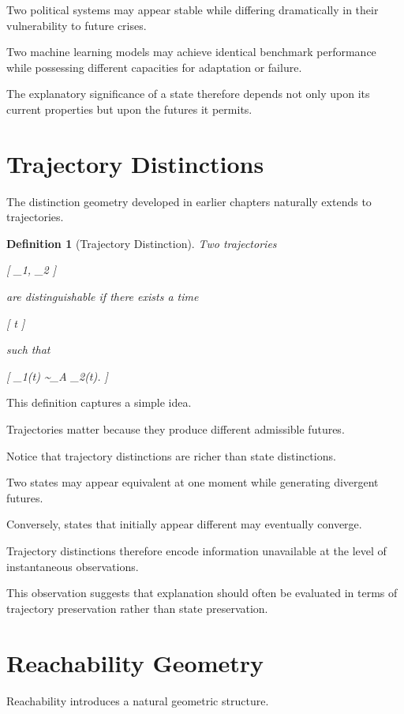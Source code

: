 \documentclass[11pt,oneside,openany]{book}
\newtheorem{definition}{Definition}[chapter] \newtheorem{theorem}{Theorem}[chapter] \newtheorem{proposition}{Proposition}[chapter] \newtheorem{lemma}{Lemma}[chapter] \newtheorem{corollary}{Corollary}[chapter] \newtheorem{remark}{Remark}[chapter]
\begin{document}
Two political systems may appear stable while differing dramatically in their vulnerability to future crises.

Two machine learning models may achieve identical benchmark performance while possessing different capacities for adaptation or failure.

The explanatory significance of a state therefore depends not only upon its current properties but upon the futures it permits.

\section{Trajectory Distinctions}

The distinction geometry developed in earlier chapters naturally extends to trajectories.

\begin{definition}[Trajectory Distinction]

Two trajectories

[
\gamma_1,
\gamma_2
]

are distinguishable if there exists a time

[
t
]

such that

[
\gamma_1(t)
\not\sim_A
\gamma_2(t).
]

\end{definition}

This definition captures a simple idea.

Trajectories matter because they produce different admissible futures.

Notice that trajectory distinctions are richer than state distinctions.

Two states may appear equivalent at one moment while generating divergent futures.

Conversely, states that initially appear different may eventually converge.

Trajectory distinctions therefore encode information unavailable at the level of instantaneous observations.

This observation suggests that explanation should often be evaluated in terms of trajectory preservation rather than state preservation.

\section{Reachability Geometry}

Reachability introduces a natural geometric structure.
\end{document}
